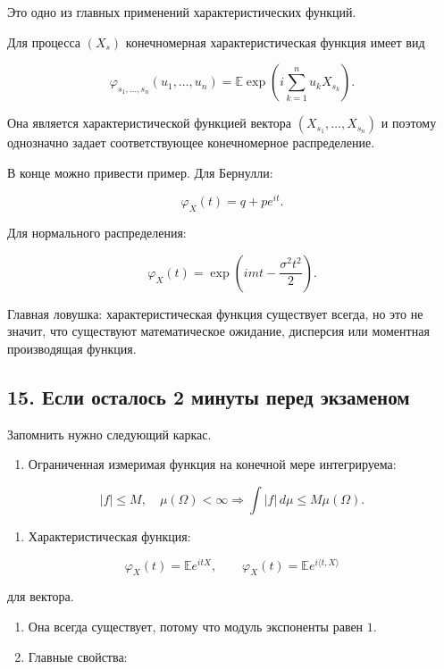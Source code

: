 \documentclass[
  11pt,
  a4paper,
]{article}
\providecommand{\tightlist}{%
  \setlength{\itemsep}{0pt}\setlength{\parskip}{0pt}}
\begin{document}
Это одно из главных применений характеристических функций.

Для процесса \((X_s)\) конечномерная характеристическая функция имеет
вид

\[
\varphi_{s_1,\ldots,s_n}(u_1,\ldots,u_n)
=
\mathbb E\exp\left(i\sum_{k=1}^n u_kX_{s_k}\right).
\]

Она является характеристической функцией вектора
\((X_{s_1},\ldots,X_{s_n})\) и поэтому однозначно задает соответствующее
конечномерное распределение.

В конце можно привести пример. Для Бернулли:

\[
\varphi_X(t)=q+pe^{it}.
\]

Для нормального распределения:

\[
\varphi_X(t)=\exp\left(imt-\frac{\sigma^2t^2}{2}\right).
\]

Главная ловушка: характеристическая функция существует всегда, но это не
значит, что существуют математическое ожидание, дисперсия или моментная
производящая функция.

\subsection{15. Если осталось 2 минуты перед
экзаменом}\label{ux435ux441ux43bux438-ux43eux441ux442ux430ux43bux43eux441ux44c-2-ux43cux438ux43dux443ux442ux44b-ux43fux435ux440ux435ux434-ux44dux43aux437ux430ux43cux435ux43dux43eux43c}

Запомнить нужно следующий каркас.

\begin{enumerate}
\def\labelenumi{\arabic{enumi}.}
\tightlist
\item
  Ограниченная измеримая функция на конечной мере интегрируема:
\end{enumerate}

\[
|f|\le M,\quad \mu(\Omega)<\infty
\Rightarrow
\int |f|\,d\mu\le M\mu(\Omega).
\]

\begin{enumerate}
\def\labelenumi{\arabic{enumi}.}
\setcounter{enumi}{1}
\tightlist
\item
  Характеристическая функция:
\end{enumerate}

\[
\varphi_X(t)=\mathbb E e^{itX},
\qquad
\varphi_X(t)=\mathbb E e^{i\langle t,X\rangle}
\]

для вектора.

\begin{enumerate}
\def\labelenumi{\arabic{enumi}.}
\setcounter{enumi}{2}
\item
  Она всегда существует, потому что модуль экспоненты равен \(1\).
\item
  Главные свойства:
\end{enumerate}
\end{document}
